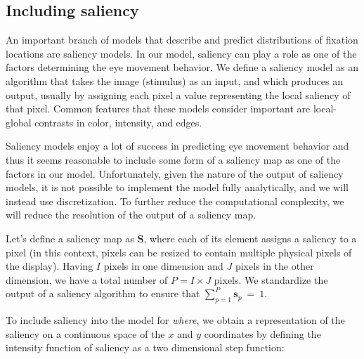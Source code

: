\documentclass{article}
\begin{document}



\subsection{Including saliency}

An important branch of models that describe and predict distributions of fixation locations are saliency models. In our model, saliency can play a role as one of the factors determining the eye movement behavior. We define a saliency model \citep{itti1998model,itti2000saliency} as an algorithm that takes the image (stimulus) as an input, and which produces an output, usually by assigning each pixel a value representing the local saliency of that pixel. Common features that these models consider important are local-global contrasts in color, intensity, and edges.

Saliency models enjoy a lot of success in predicting eye movement behavior and thus it seems reasonable to include some form of a saliency map as one of the factors in our model. Unfortunately, given the nature of the output of saliency models, it is not possible to implement the model fully analytically, and we will instead use discretization. To further reduce the computational complexity, we will reduce the resolution of the output of a saliency map.

Let's define a saliency map as $\mathbf{S}$, where each of its element assigns a saliency to a pixel (in this context, pixels can be resized to contain multiple physical pixels of the display). Having $I$ pixels in one dimension and $J$ pixels in the other dimension, we have a total number of $P = I \times J$ pixels. We standardize the output of a saliency algorithm to ensure that $\sum_{p=1}^{P} \mathbf{s}_{p}~=~1$.

To include saliency into the model for \textit{where}, we obtain a representation of the saliency on a continuous space of the $x$ and $y$ coordinates by defining the intensity function of saliency as a two dimensional step function: 
\end{document}
